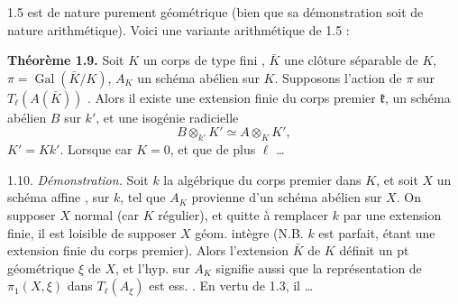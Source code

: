 \documentclass[11pt,a4paper]{article}
\begin{document}
\emph{} 1.5 est de nature purement géométrique (bien que sa démonstration soit de nature arithmétique). Voici une variante arithmétique de 1.5 :

\textbf{Théorème 1.9.} Soit $K$ un corps de type fini \struck{\ill{}}, $\bar K$ une clôture séparable de $K$, $\pi = \operatorname{Gal}(\bar K / K)$, $A_K$ un schéma abélien sur $K$. Supposons l'action de $\pi$ sur $T_\ell(A(\bar K))$  . Alors il existe une extension finie  \struck{\ill{}} du corps \ill{} \ill{} premier $\mathfrak{k}$,  un schéma abélien $B$ sur $k'$, et une isogénie radicielle 
\[
B \otimes_{k'} K' \simeq A \otimes_K K' ,
\]
$K' = K k'$. Lorsque car $K = 0$, \struck{\ill{} \ill{} \ill{}} \add{\ill{}} et que de plus $\ell$ \ldots
{}


1.10. \emph{Démonstration.}   Soit $k$ la   algébrique du corps premier dans $K$, et soit $X$ un schéma   affine  , \struck{\ill{}} sur $k$, tel que $A_K$ provienne d'un schéma abélien sur $X$.  On  supposer $X$  normal (car $K$ régulier), \add{\ill{}} et quitte à remplacer $k$ par une extension finie, il est loisible de supposer $X$ géom. intègre (N.B. $k$ est parfait, étant une extension finie du corps premier). Alors l'extension $\bar K$ de $K$ définit un pt géométrique $\xi$ de $X$, et l'hyp. sur $A_K$ signifie aussi que la représentation de $\pi_1(X,\xi)$ dans $T_\ell(A_\xi)$ est ess.  . En vertu de 1.3, \struck{\ill{}} il \ldots
\end{document}
